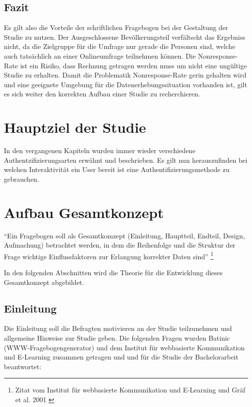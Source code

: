 \subsection{Fazit}\label{fazit}

Es gilt also die Vorteile der schriftlichen Fragebogen bei der
Gestaltung der Studie zu nutzen. Der Ausgeschlossene Bevölkerungsteil
verfältscht das Ergebniss nicht, da die Zielgruppe für die Umfrage nur
gerade die Personen sind, welche auch tatsächlich an einer Onlineumfrage
teilnehmen können. Die Nonresponse-Rate ist ein Risiko, dass Rechnung
getragen werden muss um nicht eine ungültige Studie zu erhalten. Damit
die Problematik Nonresponse-Rate gerin gehalten wird und eine geeignete
Umgebung für die Datenerhebungssituation vorhanden ist, gilt es sich
weiter den korrekten Aufbau einer Studie zu recherchieren.

\newpage

\section{Hauptziel der Studie}\label{hauptziel-der-studie}

In den vergangenen Kapiteln wurden immer wieder verschiedene
Authentzifizierungsarten erwähnt und beschrieben. Es gilt nun
herauszufinden bei welchen Interaktivität ein User bereit ist eine
Authentifizierungsmethode zu gebrauchen.

\section{Aufbau Gesamtkonzept}\label{aufbau-gesamtkonzept}

``Ein Fragebogen soll als Gesamtkomzept (Einleitung, Hauptteil, Endteil,
Design, Aufmachung) betrachtet werden, in dem die Reihenfolge und die
Struktur der Frage wichtige Einflussfaktoren zur Erlangung korrekter
Daten sind'' \footnote{Zitat vom Institut für webbasierte Kommunikation
  und E-Learning und Gräf et al. 2001 \autocite{fragebogen}}

In den folgenden Abschnitten wird die Theorie für die Entwicklung dieses
Gesamtkonzept abgebildet.

\subsection{Einleitung}\label{einleitung}

Die Einleitung soll die Befragten motivieren an der Studie teilzunehmen
und allgemeine Hinweise zur Studie geben. Die folgenden Fragen wurden
Batinic (WWW-Fragebogengenerator) und dem Institut für webbasierte
Kommunikation und E-Learning zusammen getragen und und für die Studie
der Bachelorarbeit beantwortet:

